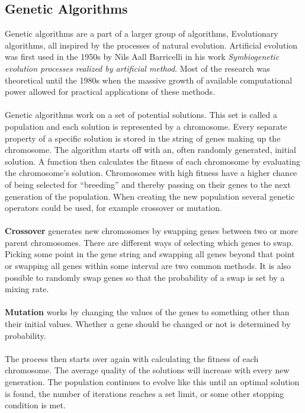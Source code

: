 \documentclass[titlepage,a4paper]{article}
\begin{document}
\subsection{Genetic Algorithms}
Genetic algorithms are a part of a larger group of algorithms, Evolutionary algorithms, all inspired by the processes of natural evolution. Artificial evolution was first used in the 1950s by Nils Aall Barricelli in his work \emph{Symbiogenetic evolution processes realized by artificial method}. Most of the research was theoretical until the 1980s when the massive growth of available computational power allowed for practical applications of these methods. \\\\
Genetic algorithms work on a set of potential solutions. This set is called a population and each solution is represented by a chromosome. Every separate property of a specific solution is stored in the string of genes making up the chromosome. The algorithm starts off with an, often randomly generated, initial solution. A function then calculates the fitness of each chromosome by evaluating the chromosome’s solution. Chromosomes with high fitness have a higher chance of being selected for “breeding” and thereby passing on their genes to the next generation of the population. When creating the new population several genetic operators could be used, for example crossover or mutation.  \\\\
\textbf{Crossover} generates new chromosomes by swapping genes between two or more parent chromosomes. There are different ways of selecting which genes to swap. Picking some point in the gene string and swapping all genes beyond that point or swapping all genes within some interval are two common methods. It is also possible to randomly swap genes so that the probability of a swap is set by a mixing rate. \\\\
\textbf{Mutation} works by changing the values of the genes to something other than their initial values. Whether a gene should be changed or not is determined by probability\cite{anApp05}. \\\\
The process then starts over again with calculating the fitness of each chromosome. The average quality of the solutions will increase with every new generation. The population continues to evolve like this until an optimal solution is found, the number of iterations reaches a set limit, or some other stopping condition is met. \\\\
\end{document}
